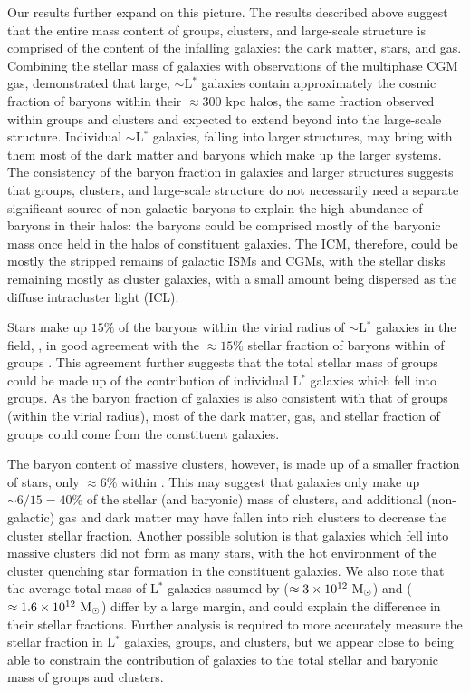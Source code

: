 Our results further expand on this picture. The results described
above suggest that the entire mass content of groups, clusters, and
large-scale structure is comprised of the content of the infalling
galaxies: the dark matter, stars, and gas. Combining the stellar mass
of galaxies with observations of the multiphase CGM gas,
\citet{Werk2014} demonstrated that large, $\sim$L$^*$ galaxies contain
approximately the cosmic fraction of baryons within their $\approx300$
kpc halos, the same fraction observed within groups and clusters and
expected to extend beyond into the large-scale structure. Individual
$\sim$L$^*$ galaxies, falling into larger structures, may bring with
them most of the dark matter and baryons which make up the larger
systems. The consistency of the baryon fraction in galaxies and larger
structures suggests that groups, clusters, and large-scale structure
do not necessarily need a separate significant source of non-galactic
baryons to explain the high abundance of baryons in their halos: the
baryons could be comprised mostly of the baryonic mass once held in
the halos of constituent galaxies. The ICM, therefore, could be mostly
the stripped remains of galactic ISMs and CGMs, with the stellar disks
remaining mostly as cluster galaxies, with a small amount being
dispersed as the diffuse intracluster light (ICL).

Stars make up $15\%$ of the baryons within the virial radius of
$\sim$L$^*$ galaxies in the field, \citep{Werk2014}, in good agreement
with the $\approx15\%$ stellar fraction of baryons within \rvir{} of
groups \citep{Bahcall2014}. This agreement further suggests that the
total stellar mass of groups could be made up of the contribution of
individual L$^*$ galaxies which fell into groups. As the baryon
fraction of galaxies is also consistent with that of groups (within
the virial radius), most of the dark matter, gas, and stellar fraction
of groups could come from the constituent galaxies.

The baryon content of massive clusters, however, is made up of a
smaller fraction of stars, only $\approx6\%$ within \rvir. This may
suggest that galaxies only make up $\sim 6/15 = 40\%$ of the stellar
(and baryonic) mass of clusters, and additional (non-galactic) gas and
dark matter may have fallen into rich clusters to decrease the cluster
stellar fraction. Another possible solution is that galaxies which
fell into massive clusters did not form as many stars, with the hot
environment of the cluster quenching star formation in the constituent
galaxies. We also note that the average total mass of L$^*$ galaxies
assumed by \citet{Bahcall2014} ($\approx 3\times 10^{12}~\textrm{M}_\odot$) and
\citet{Werk2014} ($\approx1.6\times 10^{12}~\textrm{M}_\odot$) differ by a large
margin, and could explain the difference in their stellar
fractions. Further analysis is required to more accurately measure the
stellar fraction in L$^*$ galaxies, groups, and clusters, but we
appear close to being able to constrain the contribution of galaxies
to the total stellar and baryonic mass of groups and clusters.


